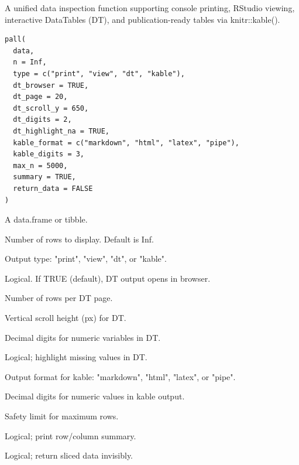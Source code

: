 \documentclass[a4paper]{book}
\begin{document}
%
\begin{Description}
A unified data inspection function supporting console printing,
RStudio viewing, interactive DataTables (DT), and publication-ready
tables via knitr::kable().
\end{Description}
%
\begin{Usage}
\begin{verbatim}
pall(
  data,
  n = Inf,
  type = c("print", "view", "dt", "kable"),
  dt_browser = TRUE,
  dt_page = 20,
  dt_scroll_y = 650,
  dt_digits = 2,
  dt_highlight_na = TRUE,
  kable_format = c("markdown", "html", "latex", "pipe"),
  kable_digits = 3,
  max_n = 5000,
  summary = TRUE,
  return_data = FALSE
)
\end{verbatim}
\end{Usage}
%
\begin{Arguments}
\begin{ldescription}
\item[\code{data}] A data.frame or tibble.

\item[\code{n}] Number of rows to display. Default is Inf.

\item[\code{type}] Output type: "print", "view", "dt", or "kable".

\item[\code{dt\_browser}] Logical. If TRUE (default), DT output opens in browser.

\item[\code{dt\_page}] Number of rows per DT page.

\item[\code{dt\_scroll\_y}] Vertical scroll height (px) for DT.

\item[\code{dt\_digits}] Decimal digits for numeric variables in DT.

\item[\code{dt\_highlight\_na}] Logical; highlight missing values in DT.

\item[\code{kable\_format}] Output format for kable:
"markdown", "html", "latex", or "pipe".

\item[\code{kable\_digits}] Decimal digits for numeric values in kable output.

\item[\code{max\_n}] Safety limit for maximum rows.

\item[\code{summary}] Logical; print row/column summary.

\item[\code{return\_data}] Logical; return sliced data invisibly.
\end{ldescription}
\end{Arguments}
\end{document}
